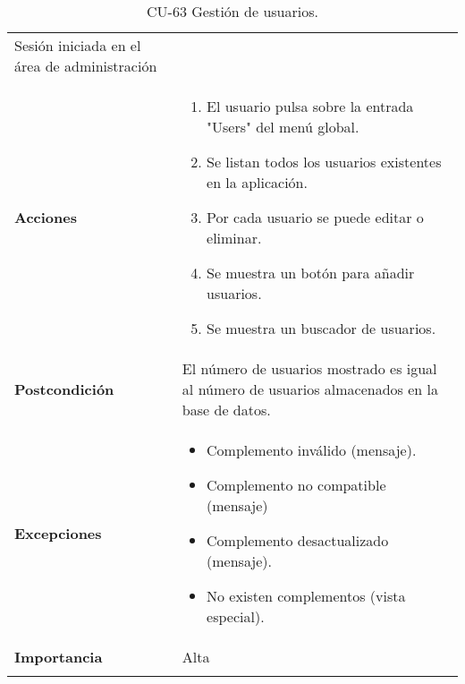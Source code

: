 \begin{longtable}[]{@{}ll@{}}
\begin{minipage}[t]{0.73\columnwidth}
Sesión iniciada en el área de administración\strut
\end{minipage}\tabularnewline
\begin{minipage}[t]{0.21\columnwidth}\raggedright
\textbf{Acciones}\strut
\end{minipage} & \begin{minipage}[t]{0.73\columnwidth}\raggedright
\begin{enumerate}
\def\labelenumi{\arabic{enumi}.}
\tightlist
\item
  El usuario pulsa sobre la entrada "Users" del menú global.
\item
  Se listan todos los usuarios existentes en la aplicación.
\item
  Por cada usuario se puede editar o eliminar.
\item
  Se muestra un botón para añadir usuarios.
\item
  Se muestra un buscador de usuarios.
\end{enumerate}\strut
\end{minipage}\tabularnewline
\begin{minipage}[t]{0.21\columnwidth}\raggedright
\textbf{Postcondición}\strut
\end{minipage} & \begin{minipage}[t]{0.73\columnwidth}\raggedright
El número de usuarios mostrado es igual al número de usuarios
almacenados en la base de datos.\strut
\end{minipage}\tabularnewline
\begin{minipage}[t]{0.21\columnwidth}\raggedright
\textbf{Excepciones}\strut
\end{minipage} & \begin{minipage}[t]{0.73\columnwidth}\raggedright
\begin{itemize}
\tightlist
\item
  Complemento inválido (mensaje).
\item
  Complemento no compatible (mensaje)
\item
  Complemento desactualizado (mensaje).
\item
  No existen complementos (vista especial).
\end{itemize}\strut
\end{minipage}\tabularnewline
\begin{minipage}[t]{0.21\columnwidth}\raggedright
\textbf{Importancia}\strut
\end{minipage} & \begin{minipage}[t]{0.73\columnwidth}\raggedright
Alta\strut
\end{minipage}\tabularnewline
\bottomrule
\caption{CU-63 Gestión de usuarios.}
\end{longtable}

